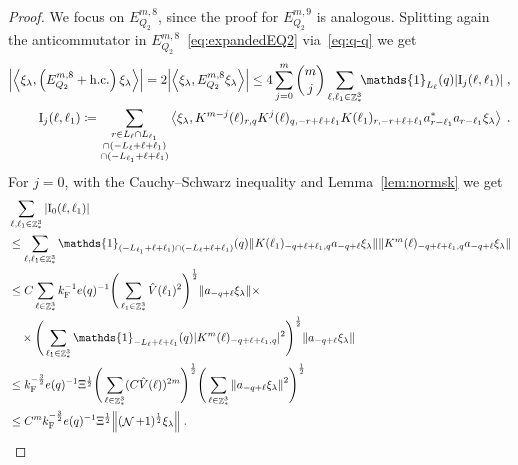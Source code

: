 \documentclass[12pt,a4paper]{article}
\numberwithin{equation}{section}
\newcommand{\1}{\mathbb{I}}
\newcommand{\F}{\mathrm{F}}
\newcommand{\I}{\mathrm{I}}
\DeclareMathOperator{\Z}{\mathbb{Z}}
\DeclareMathOperator{\NN}{\mathcal{N}}
\newcommand{\half}{\frac{1}{2}}
\newcommand{\eva}[1]{\left\langle #1 \right\rangle}
\theoremstyle{plain}
\theoremstyle{definition}
\theoremstyle{remark}
\theoremstyle{plain}
\theoremstyle{definition}
\theoremstyle{remark}
\begin{document}
\begin{proof}
We focus on $ E^{m,8}_{Q_2} $, since the proof for $ E^{m,9}_{Q_2} $ is analogous.
Splitting again the anticommutator in $ E^{m,8}_{Q_2} $~\eqref{eq:expandedEQ2} via~\eqref{eq:q-q} we get
\begin{equation} \label{eq:EQ2181}
\begin{aligned}
	\abs{\eva{\xi_\lambda,\left(E^{m,8}_{Q_2}+\mathrm{h.c.}\right) \xi_\lambda }} 
	= 2\abs{\eva{\xi_\lambda, E^{m,8}_{Q_2} \xi_\lambda }}
	\le 4 \sum_{j=0}^m {{m}\choose j} \sum\limits_{\ell,\ell_1 \in \Z^3_*}\!\! \mathds{1}_{L_\ell}(q) |\I_j(\ell, \ell_1)| \;,\\
	\I_j(\ell, \ell_1)
	\coloneq \sum\limits_{\substack{r\in L_{\ell} \cap L_{\ell_1}\\\cap (-L_{\ell}+\ell+\ell_1) \\ \cap (-L_{\ell_1}+\ell+\ell_1)}}
		\eva{\xi_\lambda, K^{m-j}(\ell)_{r,q} K^{j}(\ell)_{q,-r+\ell+\ell_1} K(\ell_1)_{r,-r+\ell+\ell_1} a^*_{r-\ell_1} a_{r-\ell_1} \xi_\lambda} \;. \\
\end{aligned}
\end{equation}
For $ j = 0 $, with the Cauchy--Schwarz inequality and Lemma~\ref{lem:normsk} we get
\textcolor{green!30!black}{
\begin{align}
	&\sum_{\ell,\ell_1 \in \Z^3_*} |\I_0(\ell, \ell_1)| \nonumber\\
	&\le \sum_{\ell,\ell_1 \in \Z^3_*} \mathds{1}_{(-L_{\ell_1} + \ell + \ell_1) \cap (-L_\ell + \ell + \ell_1)}(q)
		\norm{ K(\ell_1)_{-q+\ell+\ell_1,q} a_{-q+\ell} \xi_\lambda}
		\norm{ K^m(\ell)_{-q+\ell+\ell_1,q} a_{-q+\ell} \xi_\lambda } \nonumber\\
	&\le C \sum_{\ell \in \Z^3_*} k_{\F}^{-1} e(q)^{-1}
		\Bigg( \sum_{\ell_1 \in \Z^3_*} \hat{V}(\ell_1)^2 \Bigg)^{\half}
		\norm{ a_{-q+\ell} \xi_\lambda} \times \nonumber\\
	&\quad \times \Bigg( \sum_{\ell_1 \in \Z^3_*} \mathds{1}_{-L_\ell + \ell + \ell_1}(q) |K^m(\ell)_{-q+\ell+\ell_1,q}|^2 \Bigg)^{\half}
		\norm{ a_{-q+\ell} \xi_\lambda } \nonumber\\
	&\le k_{\F}^{-\frac 32} e(q)^{-1} \Xi^\half
		\Bigg( \sum_{\ell \in \Z^3_*} (C \hat{V}(\ell))^{2m} \Bigg)^{\half}
		\Bigg( \sum_{\ell \in \Z^3_*} \norm{a_{-q+\ell} \xi_\lambda }^2 \Bigg)^{\half} \nonumber\\
	&\leq C^m k_{\F}^{-\frac 32} e(q)^{-1} \Xi^{\half} \norm{(\NN+1)^{\half} \xi_\lambda} \;. \label{eq:estEQ2181}
\end{align}
}
\end{proof}
\end{document}
